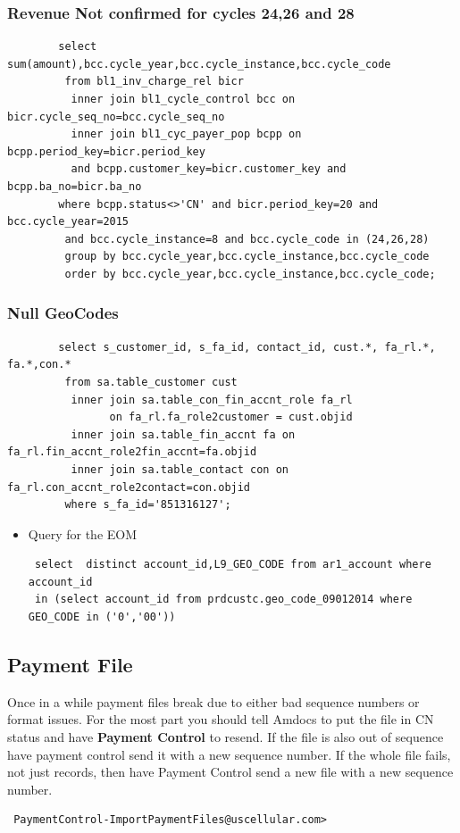 \documentclass[12pt,twoside]{article}
\begin{document}
\subsubsection{Revenue Not confirmed for cycles 24,26 and 28}
\label{sec-11-3-2}

\begin{verbatim}
        select sum(amount),bcc.cycle_year,bcc.cycle_instance,bcc.cycle_code
         from bl1_inv_charge_rel bicr 
          inner join bl1_cycle_control bcc on bicr.cycle_seq_no=bcc.cycle_seq_no 
          inner join bl1_cyc_payer_pop bcpp on bcpp.period_key=bicr.period_key 
          and bcpp.customer_key=bicr.customer_key and bcpp.ba_no=bicr.ba_no
        where bcpp.status<>'CN' and bicr.period_key=20 and bcc.cycle_year=2015 
         and bcc.cycle_instance=8 and bcc.cycle_code in (24,26,28)
         group by bcc.cycle_year,bcc.cycle_instance,bcc.cycle_code
         order by bcc.cycle_year,bcc.cycle_instance,bcc.cycle_code;
\end{verbatim}
\subsubsection{Null GeoCodes}
\label{sec-11-3-3}

\begin{verbatim}
        select s_customer_id, s_fa_id, contact_id, cust.*, fa_rl.*, fa.*,con.*
         from sa.table_customer cust
          inner join sa.table_con_fin_accnt_role fa_rl 
                on fa_rl.fa_role2customer = cust.objid
          inner join sa.table_fin_accnt fa on fa_rl.fin_accnt_role2fin_accnt=fa.objid
          inner join sa.table_contact con on fa_rl.con_accnt_role2contact=con.objid
         where s_fa_id='851316127';
\end{verbatim}
\begin{itemize}

\item Query for the EOM
\label{sec-11-3-3-1}%
\begin{verbatim}
 select  distinct account_id,L9_GEO_CODE from ar1_account where account_id 
 in (select account_id from prdcustc.geo_code_09012014 where GEO_CODE in ('0','00'))
\end{verbatim}
\end{itemize} %
\subsection{Payment File}
\label{sec-11-4}

   Once in a while payment files break due to either bad sequence numbers or format issues. For the most part you should tell Amdocs to put the file in CN status and have \textbf{Payment Control} to resend.
   If the file is also out of sequence have payment control send it with a new sequence number. If the whole file fails, not just records, then have Payment Control send a new file with a new sequence number.
\begin{verbatim}
 PaymentControl-ImportPaymentFiles@uscellular.com>
\end{verbatim}
\end{document}
